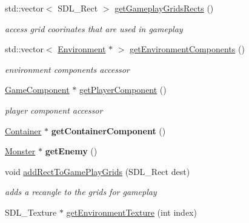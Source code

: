 \begin{DoxyCompactItemize}
std\+::vector$<$ S\+D\+L\+\_\+\+Rect $>$ \hyperlink{class_level_a040994ac065280b1d52524bbcba2bbaa}{get\+Gameplay\+Grids\+Rects} ()
\begin{DoxyCompactList}\small\item\em access grid coorinates that are used in gameplay \end{DoxyCompactList}\item 
\hypertarget{class_level_ae3f60439fa36c03b1dfcf1d3e6594b23}{}\label{class_level_ae3f60439fa36c03b1dfcf1d3e6594b23} 
std\+::vector$<$ \hyperlink{class_environment}{Environment} $\ast$ $>$ \hyperlink{class_level_ae3f60439fa36c03b1dfcf1d3e6594b23}{get\+Environment\+Components} ()
\begin{DoxyCompactList}\small\item\em environment components accessor \end{DoxyCompactList}\item 
\hypertarget{class_level_a190ab96a4270516c4f89e356231ef243}{}\label{class_level_a190ab96a4270516c4f89e356231ef243} 
\hyperlink{class_game_component}{Game\+Component} $\ast$ \hyperlink{class_level_a190ab96a4270516c4f89e356231ef243}{get\+Player\+Component} ()
\begin{DoxyCompactList}\small\item\em player component accessor \end{DoxyCompactList}\item 
\hypertarget{class_level_a8ff05204c68c313eb656cd2897842721}{}\label{class_level_a8ff05204c68c313eb656cd2897842721} 
\hyperlink{class_container}{Container} $\ast$ {\bfseries get\+Container\+Component} ()
\item 
\hypertarget{class_level_a0c2bba08da53fd7894c80c4e6ecd402c}{}\label{class_level_a0c2bba08da53fd7894c80c4e6ecd402c} 
\hyperlink{class_monster}{Monster} $\ast$ {\bfseries get\+Enemy} ()
\item 
\hypertarget{class_level_ac5fecd0532486e19176f0ca3dced9c23}{}\label{class_level_ac5fecd0532486e19176f0ca3dced9c23} 
void \hyperlink{class_level_ac5fecd0532486e19176f0ca3dced9c23}{add\+Rect\+To\+Game\+Play\+Grids} (S\+D\+L\+\_\+\+Rect dest)
\begin{DoxyCompactList}\small\item\em adds a recangle to the grids for gameplay \end{DoxyCompactList}\item 
\hypertarget{class_level_a419a998f8496fb65d593eea06b454f18}{}\label{class_level_a419a998f8496fb65d593eea06b454f18} 
S\+D\+L\+\_\+\+Texture $\ast$ \hyperlink{class_level_a419a998f8496fb65d593eea06b454f18}{get\+Environment\+Texture} (int index)

\end{DoxyCompactItemize}
